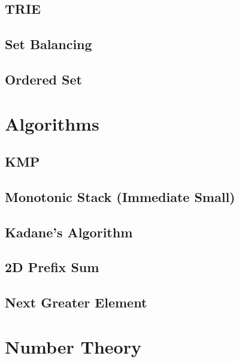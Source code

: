 \documentclass[10pt, a4paper,twocolumn]{article}
\begin{document}
\subsection{TRIE}


\subsection{Set Balancing}


\subsection{Ordered Set}


\section{Algorithms}

\subsection{KMP}


\subsection{Monotonic Stack (Immediate \allowbreak Small)}


\subsection{Kadane’s Algorithm}


\subsection{2D Prefix Sum}


\subsection{Next Greater Element}


\section{Number Theory}
\end{document}
